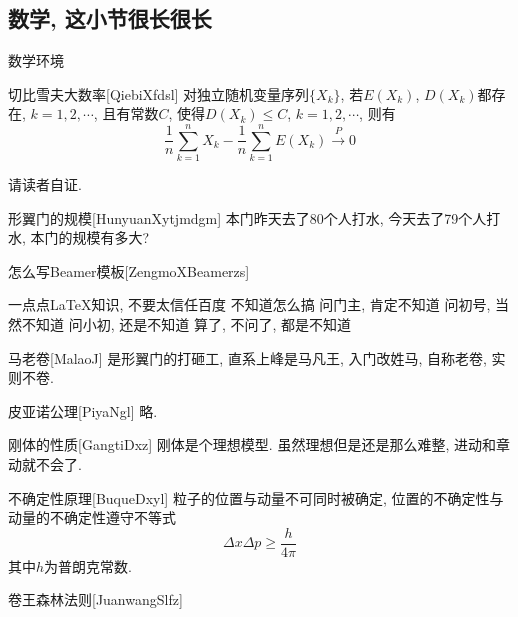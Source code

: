 \documentclass[hyperref, UTF8, CJK]{beamer}
\begin{document}
\subsection{数学, 这小节很长很长}
\begin{frame}{数学环境}
	\begin{scutheorem}{切比雪夫大数率}[QiebiXfdsl]
		对独立随机变量序列$\{X_k\}$, 若$E(X_k)$, $D(X_k)$都存在, $k=1,2,\cdots$, 且有常数$C$, 使得$D(X_k)\leq C$, $k=1,2,\cdots$, 则有
		\begin{equation}
		\dfrac{1}{n} \sum_{k=1}^{n} X_k - \dfrac{1}{n} \sum_{k=1}^{n} E(X_k) \stackrel{\;P\;}{\longrightarrow} 0
		\end{equation}
	\end{scutheorem}
	\begin{scuproof}{}
		请读者自证.
	\end{scuproof}
	\begin{scuexample}{形翼门的规模}[HunyuanXytjmdgm]
		本门昨天去了80个人打水, 今天去了79个人打水, 本门的规模有多大?
	\end{scuexample}
	\begin{scualgorithm}{怎么写Beamer模板}[ZengmoXBeamerzs]
		\begin{algorithmic}[1]
			\REQUIRE 一点点\LaTeX 知识, 不要太信任百度
			\ENSURE 不知道怎么搞
			\STATE 问门主, 肯定不知道
			\STATE 问初号, 当然不知道
			\STATE 问小初, 还是不知道
			\RETURN 算了, 不问了, 都是不知道
		\end{algorithmic}
	\end{scualgorithm}
	\begin{scudefinition}{马老卷}[MalaoJ]
		是形翼门的打砸工, 直系上峰是马凡王, 入门改姓马, 自称老卷, 实则不卷.
	\end{scudefinition}
	\begin{scuaxiom}{皮亚诺公理}[PiyaNgl]
		略.
	\end{scuaxiom}
	\begin{scuproperty}{刚体的性质}[GangtiDxz]
		刚体是个理想模型. 虽然理想但是还是那么难整, 进动和章动就不会了.
	\end{scuproperty}
	\begin{scuproposition}{不确定性原理}[BuqueDxyl]
		粒子的位置与动量不可同时被确定, 位置的不确定性与动量的不确定性遵守不等式
		\begin{equation}
		\Delta x \Delta p \geq \dfrac{h}{4\pi}
		\end{equation}
		其中$h$为普朗克常数.
	\end{scuproposition}
	\begin{sculemma}{卷王森林法则}[JuanwangSlfz]

\end{sculemma}
\end{frame}
\end{document}
